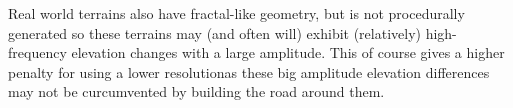 Real world terrains also have fractal-like geometry\cite{fractalnature}, but is not procedurally generated so these terrains may (and often will) exhibit (relatively) high-frequency elevation changes with a large amplitude. This of course gives a higher penalty for using a lower resolutionas these big amplitude elevation differences may not be curcumvented by building the road around them.
